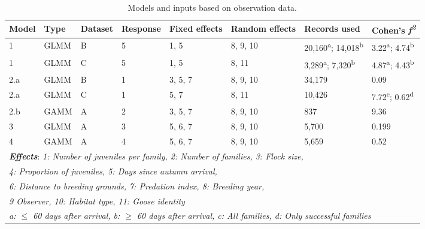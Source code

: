 \documentclass[10pt,twocolumn]{paper}
\begin{document}
\begin{table*} \centering
\begin{tabular}{l*7l}
\toprule
Model & Type & Dataset & Response & Fixed effects & Random effects & Records used & Cohen's \emph{f\textsuperscript{2}}\\
\midrule
1 & GLMM & B & 5 & 1, 5 & 8, 9, 10 & 20,160\textsuperscript{a}; 14,018\textsuperscript{b} & 3.22\textsuperscript{a}; 4.74\textsuperscript{b}\\

1 & GLMM & C & 5 & 1, 5 & 8, 11 & 3,289\textsuperscript{a}; 7,320\textsuperscript{b} & 4.87\textsuperscript{a}; 4.43\textsuperscript{b}\\

2.a & GLMM & B & 1 & 3, 5, 7 & 8, 9, 10 & 34,179 & 0.09\\

2.a & GLMM & C & 1 & 5, 7 & 8, 11 & 10,426 & 7.72\textsuperscript{c}; 0.62\textsuperscript{d} \\

2.b & GAMM & A & 2 & 3, 5, 7 & 8, 9, 10 & 837 & 9.36\\

3 & GLMM & A & 3 & 5, 6, 7 & 8, 9, 10 & 5,700 & 0.199\\

4 & GAMM & A & 4 & 5, 6, 7 & 8, 9, 10 & 5,659 & 0.52\\\midrule

\multicolumn{8}{l}{\textbf{\emph{Effects}}: \emph{1: Number of juveniles per family, 2: Number of families, 3: Flock size,}} \\
\multicolumn{8}{l}{\emph{4: Proportion of juveniles, 5: Days since autumn arrival,}} \\
\multicolumn{8}{l}{\emph{6: Distance to breeding grounds, 7: Predation index, 8: Breeding year,}} \\
\multicolumn{8}{l}{\emph{9 Observer, 10: Habitat type, 11: Goose identity}} \\
\midrule
\multicolumn{8}{l}{\emph{a: \ensuremath{\le} 60 days after arrival, b: \ensuremath{\ge} 60 days after arrival, c: All families, d: Only successful families}} \\
\bottomrule
\end{tabular}
\caption{Models and inputs based on observation data.}
\end{table*}
\end{document}
